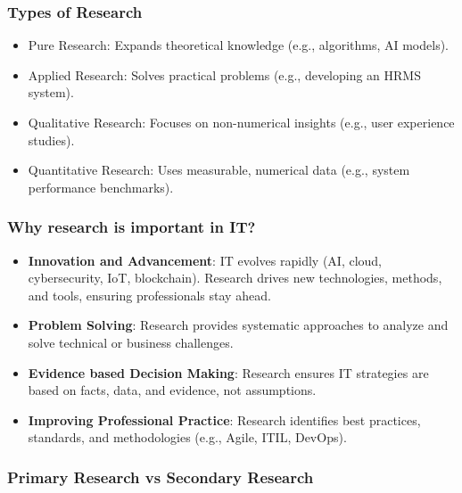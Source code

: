 \subsubsection{Types of Research}

\begin{itemize}
    \item Pure Research: Expands theoretical knowledge (e.g., algorithms, AI models).
    \item Applied Research: Solves practical problems (e.g., developing an HRMS system).
    \item Qualitative Research: Focuses on non-numerical insights (e.g., user experience studies).
    \item Quantitative Research: Uses measurable, numerical data (e.g., system performance benchmarks).
\end{itemize}

\subsubsection{Why research is important in IT?}

\begin{itemize}
    \item \textbf{Innovation and Advancement}: IT evolves rapidly (AI, cloud, cybersecurity, IoT, blockchain). Research drives new technologies, methods, and tools, ensuring professionals stay ahead.
    \item \textbf{Problem Solving}: Research provides systematic approaches to analyze and solve technical or business challenges.
    \item \textbf{Evidence based Decision Making}: Research ensures IT strategies are based on facts, data, and evidence, not assumptions.
    \item \textbf{Improving Professional Practice}: Research identifies best practices, standards, and methodologies (e.g., Agile, ITIL, DevOps).
\end{itemize}

\subsubsection{Primary Research vs Secondary Research}

